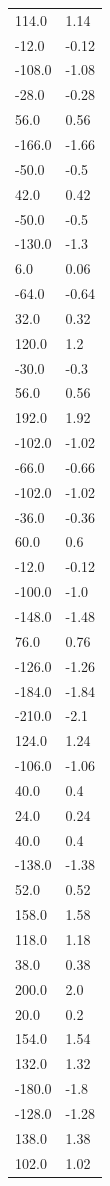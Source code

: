 \begin{longtable}{ll}
114.0 & 1.14 \\
-12.0 & -0.12 \\
-108.0 & -1.08 \\
-28.0 & -0.28 \\
56.0 & 0.56 \\
-166.0 & -1.66 \\
-50.0 & -0.5 \\
42.0 & 0.42 \\
-50.0 & -0.5 \\
-130.0 & -1.3 \\
6.0 & 0.06 \\
-64.0 & -0.64 \\
32.0 & 0.32 \\
120.0 & 1.2 \\
-30.0 & -0.3 \\
56.0 & 0.56 \\
192.0 & 1.92 \\
-102.0 & -1.02 \\
-66.0 & -0.66 \\
-102.0 & -1.02 \\
-36.0 & -0.36 \\
60.0 & 0.6 \\
-12.0 & -0.12 \\
-100.0 & -1.0 \\
-148.0 & -1.48 \\
76.0 & 0.76 \\
-126.0 & -1.26 \\
-184.0 & -1.84 \\
-210.0 & -2.1 \\
124.0 & 1.24 \\
-106.0 & -1.06 \\
40.0 & 0.4 \\
24.0 & 0.24 \\
40.0 & 0.4 \\
-138.0 & -1.38 \\
52.0 & 0.52 \\
158.0 & 1.58 \\
118.0 & 1.18 \\
38.0 & 0.38 \\
200.0 & 2.0 \\
20.0 & 0.2 \\
154.0 & 1.54 \\
132.0 & 1.32 \\
-180.0 & -1.8 \\
-128.0 & -1.28 \\
138.0 & 1.38 \\
102.0 & 1.02 \\

\end{longtable}
